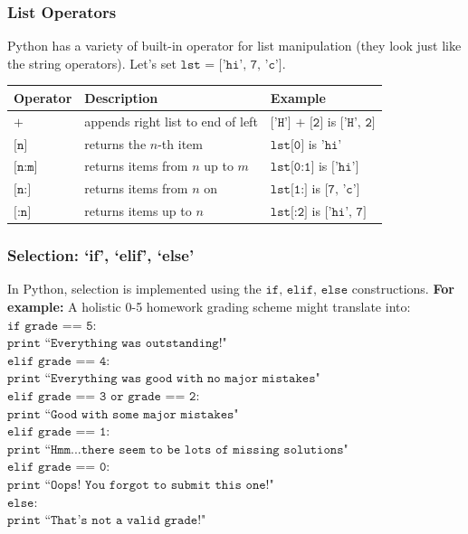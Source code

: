 \documentclass[12pt,t]{beamer}
\begin{document}
\begin{frame}  
  \frametitle{List Operators}
    Python has a variety of built-in operator for list manipulation (they look just like the string operators).
    \vskip0.2cm
  Let's set $\texttt{lst = ['hi', 7, 'c']}$.
  \vskip0.2cm
  \scriptsize
  \renewcommand{\arraystretch}{1.5}
  \begin{tabular}{l l l}
  \textbf{Operator} & \textbf{Description} & \textbf{Example}\\
  \hline
  $\texttt{+}$ & {appends right list to end of left} & {$\texttt{['H'] + [2]}$ is $\texttt{['H', 2]}$}\\
  $\texttt{[n]}$ & {returns the $n$-th item} & {$\texttt{lst[0]}$ is $\texttt{'hi'}$}\\
  $\texttt{[n:m]}$ & {returns items from $n$ up to $m$} & {$\texttt{lst[0:1]}$ is $\texttt{['hi']}$}\\
  $\texttt{[n:]}$ & {returns items from $n$ on} & {$\texttt{lst[1:]}$ is $\texttt{[7, 'c']}$}\\
  $\texttt{[:n]}$ & {returns items up to $n$} & {$\texttt{lst[:2]}$ is $\texttt{['hi', 7]}$}\\
  \end{tabular}
\end{frame}

\begin{frame}
  \frametitle{Selection: `if', `elif', `else'}
  In Python, selection is implemented using the $\texttt{if, elif, else}$ constructions.
  \vskip0.2cm
  \textbf{For example: } A holistic 0-5 homework grading scheme might translate into: 
  \vskip0.2cm
  \scriptsize{
 \noindent\hskip0.9cm$\texttt{if grade == 5:}$\\
  \hskip1.5cm$\texttt{print ``Everything was outstanding!"}$\\
  \hskip0.9cm$\texttt{elif grade == 4:}$\\
  \hskip1.5cm$\texttt{print ``Everything was good with no major mistakes"}$\\
  \hskip0.9cm$\texttt{elif grade == 3 or grade == 2:}$\\
  \hskip1.5cm$\texttt{print ``Good with some major mistakes"}$\\
  \hskip0.9cm$\texttt{elif grade == 1:}$\\
  \hskip1.5cm$\texttt{print ``Hmm...there seem to be lots of missing solutions"}$\\
  \hskip0.9cm$\texttt{elif grade == 0:}$\\
  \hskip1.5cm$\texttt{print ``Oops! You forgot to submit this one!"}$\\
  \hskip0.9cm$\texttt{else:}$\\
  \hskip1.5cm$\texttt{print ``That's not a valid grade!"}$
  }
\end{frame}
\end{document}
